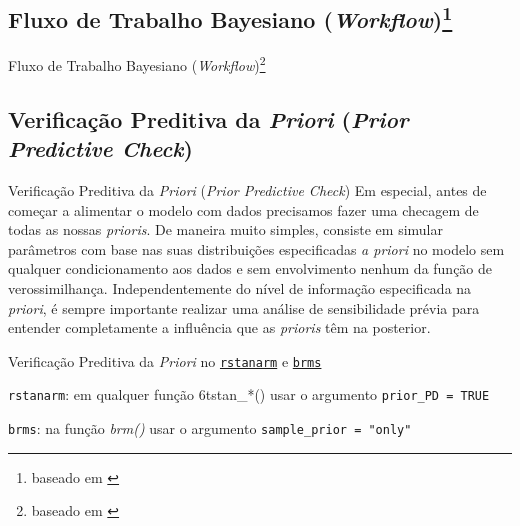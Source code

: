 \subsection{Fluxo de Trabalho Bayesiano (\textit{Workflow})\footnote{baseado em \textcite{gelmanBayesianWorkflow2020}}}
\begin{frame}{Fluxo de Trabalho Bayesiano (\textit{Workflow})\footnote{baseado em \textcite{gelmanBayesianWorkflow2020}}}
	\centering
\end{frame}

\subsection{Verificação Preditiva da \textit{Priori} (\textit{Prior Predictive Check})}
\begin{frame}{Verificação Preditiva da \textit{Priori} (\textit{Prior Predictive Check})}
	Em especial, antes de começar a alimentar o modelo com dados precisamos fazer uma
	checagem de todas as nossas \textit{prioris}.
	\vfill
	De maneira muito simples, consiste em simular parâmetros com base nas suas distribuições
	especificadas \textit{a priori} no modelo sem qualquer condicionamento aos dados e
	sem envolvimento nenhum da função de verossimilhança.
	\vfill
	Independentemente do nível de informação especificada na \textit{priori},
	é sempre importante realizar uma análise de sensibilidade prévia para entender completamente
	a influência que as \textit{prioris} têm na posterior.
\end{frame}

\begin{frame}{Verificação Preditiva da \textit{Priori} no \href{http://mc-stan.org/rstanarm/}{\texttt{rstanarm}} e \href{https://paul-buerkner.github.io/brms/}{\texttt{brms}}}
	\begin{vfilleditems}
		\item \texttt{rstanarm}: em qualquer função \text6t{stan\_*()} usar o argumento \texttt{prior\_PD = TRUE}
		\item \texttt{brms}: na função \textit{brm()} usar o argumento \texttt{sample\_prior = "only"}
	\end{vfilleditems}
\end{frame}

